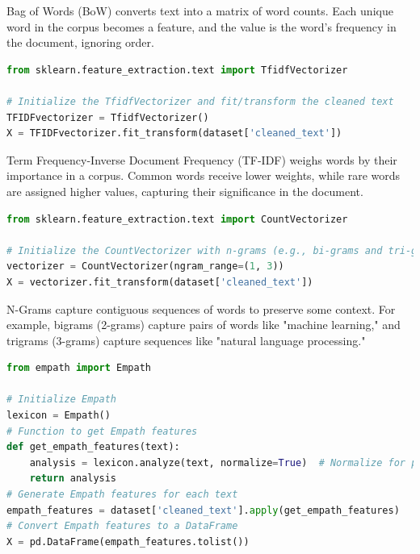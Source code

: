 \noindent
Bag of Words (BoW) converts text into a matrix of word counts. Each unique word in the corpus becomes a feature, and the value is the word's frequency in the document, ignoring order.

\begin{tcolorbox}[colback=gray!5!white, colframe=gray!80!black, boxrule=0.5pt, title=TF-IDF]
\begin{lstlisting}[language=Python]
from sklearn.feature_extraction.text import TfidfVectorizer

# Initialize the TfidfVectorizer and fit/transform the cleaned text
TFIDFvectorizer = TfidfVectorizer()
X = TFIDFvectorizer.fit_transform(dataset['cleaned_text'])
\end{lstlisting}
\end{tcolorbox}

\noindent
Term Frequency-Inverse Document Frequency (TF-IDF) weighs words by their importance in a corpus. Common words receive lower weights, while rare words are assigned higher values, capturing their significance in the document.

\begin{tcolorbox}[colback=gray!5!white, colframe=gray!80!black, boxrule=0.5pt, title=N-Gram]
\begin{lstlisting}[language=Python]
from sklearn.feature_extraction.text import CountVectorizer

# Initialize the CountVectorizer with n-grams (e.g., bi-grams and tri-grams)
vectorizer = CountVectorizer(ngram_range=(1, 3))
X = vectorizer.fit_transform(dataset['cleaned_text'])
\end{lstlisting}
\end{tcolorbox}
    
\noindent
N-Grams capture contiguous sequences of words to preserve some context. For example, bigrams (2-grams) capture pairs of words like "machine learning," and trigrams (3-grams) capture sequences like "natural language processing."

\begin{tcolorbox}[colback=gray!5!white, colframe=gray!80!black, boxrule=0.5pt, title=LIWC (Empath)]
\begin{lstlisting}[language=Python]
from empath import Empath

# Initialize Empath
lexicon = Empath()
# Function to get Empath features
def get_empath_features(text):
    analysis = lexicon.analyze(text, normalize=True)  # Normalize for proportions
    return analysis
# Generate Empath features for each text
empath_features = dataset['cleaned_text'].apply(get_empath_features)
# Convert Empath features to a DataFrame
X = pd.DataFrame(empath_features.tolist())
\end{lstlisting}
\end{tcolorbox}

